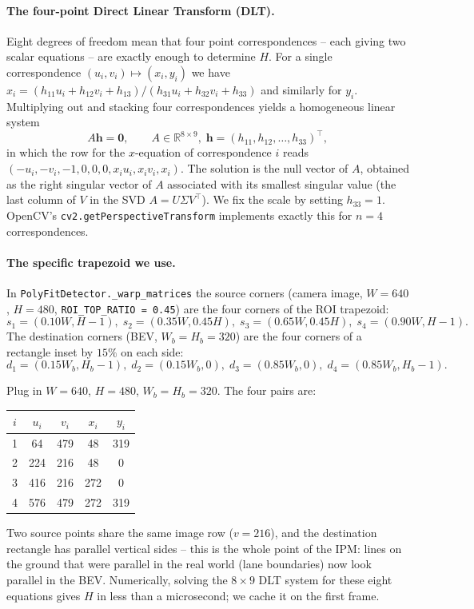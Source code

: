 \paragraph{The four-point Direct Linear Transform (DLT).}
Eight degrees of freedom mean that four point correspondences -- each
giving two scalar equations -- are exactly enough to determine $H$.
For a single correspondence $(u_i,v_i)\mapsto(x_i,y_i)$ we have
$x_i = (h_{11}u_i + h_{12}v_i + h_{13})/(h_{31}u_i + h_{32}v_i + h_{33})$
and similarly for $y_i$. Multiplying out and stacking four
correspondences yields a homogeneous linear system
\[
A\mathbf{h} = \mathbf 0,\qquad
A\in\mathbb{R}^{8\times 9},\;
\mathbf h = (h_{11},h_{12},\ldots,h_{33})^\top,
\]
in which the row for the $x$-equation of correspondence $i$ reads
$(-u_i,-v_i,-1,0,0,0,x_i u_i,x_i v_i,x_i)$. The solution is the null
vector of $A$, obtained as the right singular vector of $A$ associated
with its smallest singular value (the last column of $V$ in the SVD
$A=U\Sigma V^\top$). We fix the scale by setting $h_{33}=1$. OpenCV's
\texttt{cv2.getPerspectiveTransform} implements exactly this for
$n=4$ correspondences.

\paragraph{The specific trapezoid we use.}
In \texttt{PolyFitDetector.\_warp\_matrices} the source corners
(camera image, $W=640$, $H=480$, \texttt{ROI\_TOP\_RATIO~=~0.45}) are
the four corners of the ROI trapezoid:
\[
s_1=(0.10W,H{-}1),\;
s_2=(0.35W,0.45H),\;
s_3=(0.65W,0.45H),\;
s_4=(0.90W,H{-}1).
\]
The destination corners (BEV, $W_b=H_b=320$) are the four corners of
a rectangle inset by $15\%$ on each side:
\[
d_1=(0.15W_b,H_b{-}1),\;
d_2=(0.15W_b,0),\;
d_3=(0.85W_b,0),\;
d_4=(0.85W_b,H_b{-}1).
\]

\begin{example}
Plug in $W=640$, $H=480$, $W_b=H_b=320$. The four pairs are:
\begin{center}
\begin{tabular}{c|cccc}
$i$ & $u_i$ & $v_i$ & $x_i$ & $y_i$\\\hline
1 & 64  & 479 & 48  & 319\\
2 & 224 & 216 & 48  & 0\\
3 & 416 & 216 & 272 & 0\\
4 & 576 & 479 & 272 & 319
\end{tabular}
\end{center}
Two source points share the same image row ($v=216$), and the
destination rectangle has parallel vertical sides -- this is the whole
point of the IPM: lines on the ground that were parallel in the real
world (lane boundaries) now look parallel in the BEV. Numerically,
solving the $8\times 9$ DLT system for these eight equations gives $H$
in less than a microsecond; we cache it on the first frame.
\end{example}


